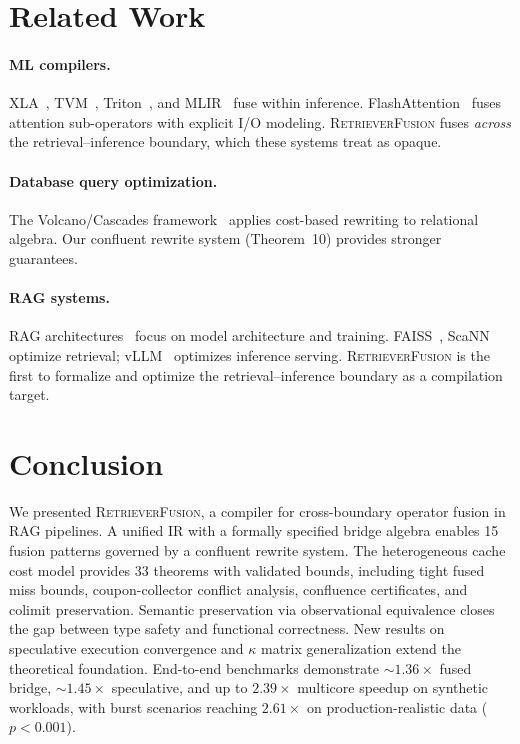 \documentclass{article}
\theoremstyle{definition}
\theoremstyle{remark}
\newcommand{\RetrieverFusion}{\textsc{RetrieverFusion}}
\begin{document}
\section{Related Work}\label{sec:related}

\paragraph{ML compilers.}
XLA~\cite{xla2017}, TVM~\cite{chen2018tvm}, Triton~\cite{tillet2019triton}, and MLIR~\cite{lattner2021mlir} fuse within inference.
FlashAttention~\cite{dao2022flashattention} fuses attention sub-operators with explicit I/O modeling.
\RetrieverFusion{} fuses \emph{across} the retrieval--inference boundary, which these systems treat as opaque.

\paragraph{Database query optimization.}
The Volcano/Cascades framework~\cite{graefe1993volcano} applies cost-based rewriting to relational algebra.
Our confluent rewrite system (Theorem~10) provides stronger guarantees.

\paragraph{RAG systems.}
RAG architectures~\cite{lewis2020rag,borgeaud2022retro,guu2020realm,izacard2022atlas} focus on model architecture and training.
FAISS~\cite{johnson2021faiss}, ScaNN~\cite{guo2020scann} optimize retrieval; vLLM~\cite{kwon2023vllm} optimizes inference serving.
\RetrieverFusion{} is the first to formalize and optimize the retrieval--inference boundary as a compilation target.

\section{Conclusion}\label{sec:conclusion}

We presented \RetrieverFusion{}, a compiler for cross-boundary operator fusion in RAG pipelines.
A unified IR with a formally specified bridge algebra enables 15 fusion patterns governed by a confluent rewrite system.
The heterogeneous cache cost model provides 33 theorems with validated bounds, including tight fused miss bounds, coupon-collector conflict analysis, confluence certificates, and colimit preservation.
Semantic preservation via observational equivalence closes the gap between type safety and functional correctness.
New results on speculative execution convergence and $\kappa$ matrix generalization extend the theoretical foundation.
End-to-end benchmarks demonstrate ${\sim}1.36\times$ fused bridge, ${\sim}1.45\times$ speculative, and up to $2.39\times$ multicore speedup on synthetic workloads, with burst scenarios reaching $2.61\times$ on production-realistic data ($p < 0.001$).
\end{document}
